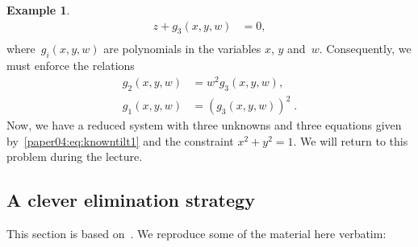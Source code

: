 \documentclass[11pt,a4paper]{article}
\theoremstyle{definition}
\newtheorem{example}{Example}
\begin{document}
\begin{example}
\begin{equation}
\begin{aligned}
    z + g_3(x,y,w)  &=  0,\\
    \end{aligned}
\end{equation}
where~$g_i(x,y,w)$ are polynomials in the variables $x$, $y$ and~$w$.
Consequently, we must enforce the relations
\begin{equation}\label{paper04:eq:knowntilt1}
\begin{aligned}
    g_2(x,y,w) &= w^2 g_3(x,y,w), \\
    g_1(x,y,w) &= \left(g_3(x,y,w)\right)^2\;.
\end{aligned}
\end{equation}
Now, we have a reduced system with three unknowns and three equations given
by~\eqref{paper04:eq:knowntilt1} and the constraint $x^2+y^2=1$.
We will return to this problem during the lecture.

\end{example}

\subsection{A clever elimination strategy}
This section is based on~\cite{kukelova-etal-2017-cvpr}. We reproduce some of the material
here verbatim:
\end{document}
